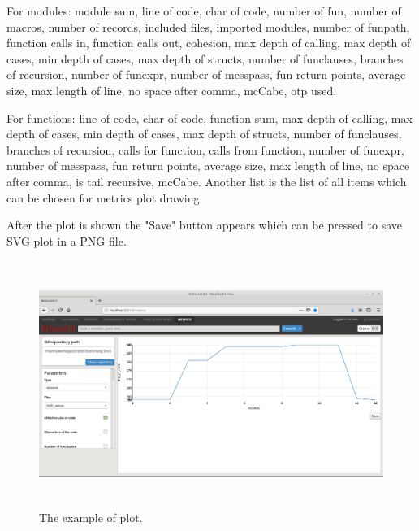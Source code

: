 For modules: module sum, line of code, char of code, number of fun, number of macros, number of records, included files, imported modules, number of funpath, function calls in, function calls out, cohesion, max depth of calling, max depth of cases, min depth of cases, max depth of structs, number of funclauses, branches of recursion, number of funexpr, number of messpass, fun return points, average size, max length of line, no space after comma, mcCabe, otp used.

For functions: line of code, char of code, function sum, max depth of calling, max depth of cases, min depth of cases, max depth of structs, number of funclauses, branches of recursion, calls for function, calls from function, number of funexpr, number of messpass, fun return points, average size, max length of line, no space after comma, is tail recursive, mcCabe. Another list is the list of all items which can be chosen for metrics plot drawing. 

After the plot is shown the "Save" button appears which can be pressed to save SVG plot in a PNG file. 

\begin{figure}[h]
	\includegraphics[height=80mm]{figures/plot.png}
	\caption{The example of plot.}
	\label{fig:metrics_plot}
\end{figure}
